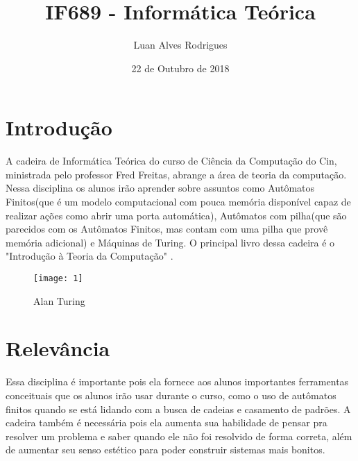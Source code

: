 \documentclass[a4paper,10pt]{extarticle}
\title{IF689 - Informática Teórica}
\author{Luan Alves Rodrigues }
\date{22 de Outubro de 2018}
\begin{document}
\maketitle

\section{Introdução}
A cadeira de Informática Teórica do curso de Ciência da Computação do Cin, ministrada pelo professor Fred Freitas, abrange a área de teoria da computação. Nessa disciplina os alunos irão aprender sobre assuntos como Autômatos Finitos(que é um modelo computacional com pouca memória disponível capaz de realizar ações como abrir uma porta automática), Autômatos com pilha(que são parecidos com os Autômatos Finitos, mas contam com uma pilha que provê memória adicional) e Máquinas de Turing. O principal livro dessa cadeira é o "Introdução à Teoria da Computação" \citep{MichaelSipser}.

\begin{figure}[h!]
\centering
\texttt{[image: 1]}
\caption{Alan Turing\citep{Imagem}}
\label{fig:1}
\end{figure}


\section{Relevância}
Essa disciplina é importante pois ela fornece aos alunos importantes ferramentas conceituais que os alunos irão usar durante o curso, como o uso de autômatos finitos quando se está lidando com a busca de cadeias e casamento de padrões. A cadeira também é necessária pois ela aumenta sua habilidade de pensar pra resolver um problema e saber quando ele não foi resolvido de forma correta, além de aumentar seu senso estético para poder construir sistemas mais bonitos.
\end{document}
